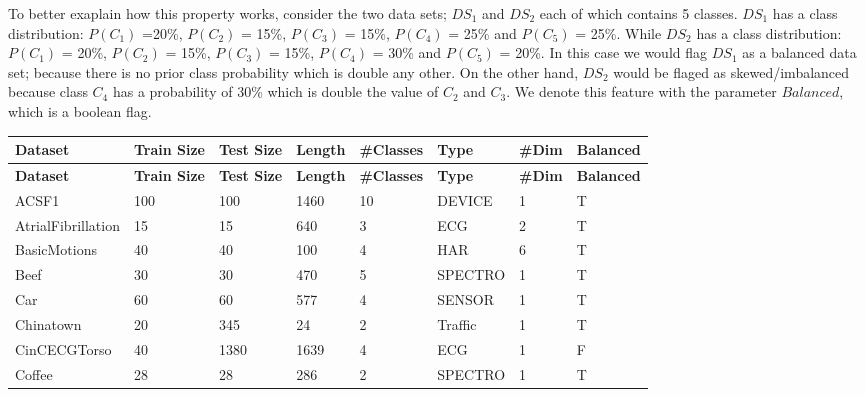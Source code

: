 To better exaplain how this property works, consider the two data sets; $DS_{1}$ and $DS_{2}$ each of which contains 5 classes.
$DS_{1}$ has a class distribution: $P(C_{1})$ =20\%, $P(C_{2})$ = 15\%, $P(C_{3})$ = 15\%, $P(C_{4})$ = 25\% and $P(C_{5})$ = 25\%.
While $DS_{2}$ has a class distribution: $P(C_{1})$ = 20\%, $P(C_{2})$ = 15\%, $P(C_{3})$ = 15\%, $P(C_{4})$ = 30\% and $P(C_{5})$ = 20\%.
In this case we would flag $DS_{1}$ as a balanced data set; because there is no prior class probability which is double any other.
On the other hand, $DS_{2}$ would be flaged as skewed/imbalanced because class $C_{4}$ has a probability of 30\% which is double the value
of $C_{2}$ and $C_{3}$. We denote this feature with the parameter $Balanced$, which is a boolean flag.

\begin{landscape}
    \begin{longtable}{|*{8}l|}
        \hline
        \textbf{Dataset} & \textbf{Train Size} & \textbf{Test Size} & \textbf{Length} & \textbf{\#Classes} & \textbf{Type} & \textbf{\#Dim} & \textbf{Balanced} \\ [0.5ex]
        \hline
        \endfirsthead %
        \hline
        \textbf{Dataset} & \textbf{Train Size} & \textbf{Test Size} & \textbf{Length} & \textbf{\#Classes} & \textbf{Type} & \textbf{\#Dim} & \textbf{Balanced} \\ [0.5ex]
        \hline
        \endhead %
        ACSF1 & 100 & 100 & 1460 & 10 & DEVICE & 1 & T \\
        \hline
        AtrialFibrillation & 15 & 15 & 640 & 3 & ECG & 2 & T \\
        \hline
        BasicMotions & 40 & 40 & 100 & 4 & HAR & 6 & T \\
        \hline
        Beef & 30 & 30 & 470 & 5 & SPECTRO & 1 & T \\
        \hline
        Car & 60 & 60 & 577 & 4 & SENSOR & 1 & T \\
        \hline
        Chinatown & 20 & 345 & 24 & 2 & Traffic & 1 & T \\
        \hline
        CinCECGTorso & 40 & 1380 & 1639 & 4 & ECG & 1 & F \\
        \hline
        Coffee & 28 & 28 & 286 & 2 & SPECTRO & 1 & T \\

\end{longtable}
\end{landscape}
